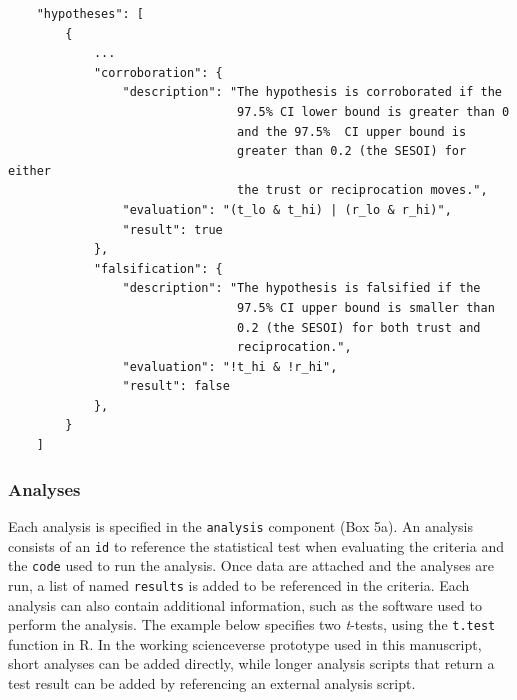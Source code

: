 \documentclass[
  english,
  doc,floatsintext]{apa6}
\begin{document}
\begin{tcolorbox}[colback=black!5!white,colframe=white!5!black,title=Box 4. Corroboration and falsification rules.]
\begin{verbatim}
    "hypotheses": [
        {
            ...
            "corroboration": {
                "description": "The hypothesis is corroborated if the 
                                97.5% CI lower bound is greater than 0 
                                and the 97.5%  CI upper bound is 
                                greater than 0.2 (the SESOI) for either 
                                the trust or reciprocation moves.",
                "evaluation": "(t_lo & t_hi) | (r_lo & r_hi)",
                "result": true
            },
            "falsification": {
                "description": "The hypothesis is falsified if the 
                                97.5% CI upper bound is smaller than 
                                0.2 (the SESOI) for both trust and 
                                reciprocation.",
                "evaluation": "!t_hi & !r_hi",
                "result": false
            },
        }
    ]
\end{verbatim}
\end{tcolorbox}

\hypertarget{analyses}{%
\subsubsection{Analyses}\label{analyses}}

Each analysis is specified in the \texttt{analysis} component (Box 5a). An analysis consists of an \texttt{id} to reference the statistical test when evaluating the criteria and the \texttt{code} used to run the analysis. Once data are attached and the analyses are run, a list of named \texttt{results} is added to be referenced in the criteria. Each analysis can also contain additional information, such as the software used to perform the analysis. The example below specifies two \emph{t}-tests, using the \texttt{t.test} function in R. In the working scienceverse prototype used in this manuscript, short analyses can be added directly, while longer analysis scripts that return a test result can be added by referencing an external analysis script.
\end{document}

